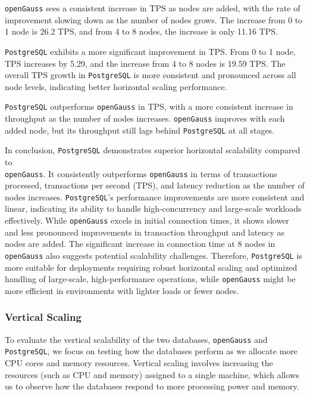 \documentclass[12pt,a4paper,cs4size]{ctexart}
\begin{document}
\texttt{openGauss} sees a consistent increase in TPS as nodes are added, with the rate of improvement slowing down as the number of nodes grows. The increase from 0 to 1 node is 26.2 TPS, and from 4 to 8 nodes, the increase is only 11.16 TPS.

\texttt{PostgreSQL} exhibits a more significant improvement in TPS. From 0 to 1 node, TPS increases by 5.29, and the increase from 4 to 8 nodes is 19.59 TPS. The overall TPS growth in \texttt{PostgreSQL} is more consistent and pronounced across all node levels, indicating better horizontal scaling performance.

\texttt{PostgreSQL} outperforms \texttt{openGauss} in TPS, with a more consistent increase in throughput as the number of nodes increases. \texttt{openGauss} improves with each added node, but its throughput still lags behind \texttt{PostgreSQL} at all stages.

In conclusion, \texttt{PostgreSQL} demonstrates superior horizontal scalability compared to \\\texttt{openGauss}. It consistently outperforms \texttt{openGauss} in terms of transactions processed, transactions per second (TPS), and latency reduction as the number of nodes increases. \texttt{PostgreSQL}'s performance improvements are more consistent and linear, indicating its ability to handle high-concurrency and large-scale workloads effectively. While \texttt{openGauss} excels in initial connection times, it shows slower and less pronounced improvements in transaction throughput and latency as nodes are added. The significant increase in connection time at 8 nodes in \texttt{openGauss} also suggests potential scalability challenges. Therefore, \texttt{PostgreSQL} is more suitable for deployments requiring robust horizontal scaling and optimized handling of large-scale, high-performance operations, while \texttt{openGauss} might be more efficient in environments with lighter loads or fewer nodes.

\subsubsection*{Vertical Scaling}

To evaluate the vertical scalability of the two databases, \texttt{openGauss} and \texttt{PostgreSQL}, we focus on testing how the databases perform as we allocate more CPU cores and memory resources. Vertical scaling involves increasing the resources (such as CPU and memory) assigned to a single machine, which allows us to observe how the databases respond to more processing power and memory.
\end{document}
